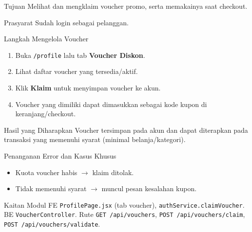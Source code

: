 
\begin{flowsection}{Tujuan}
Melihat dan mengklaim voucher promo, serta memakainya saat checkout.
\end{flowsection}

\begin{flowsection}{Prasyarat}
Sudah login sebagai pelanggan.
\end{flowsection}

\begin{flowsection}{Langkah Mengelola Voucher}
\begin{enumerate}
  \item Buka \texttt{/profile} lalu tab \textbf{Voucher Diskon}.
  \item Lihat daftar voucher yang tersedia/aktif.
  \item Klik \textbf{Klaim} untuk menyimpan voucher ke akun.
  \item Voucher yang dimiliki dapat dimasukkan sebagai kode kupon di keranjang/checkout.
\end{enumerate}
\end{flowsection}


\begin{flowsection}{Hasil yang Diharapkan}
Voucher tersimpan pada akun dan dapat diterapkan pada transaksi yang memenuhi
syarat (minimal belanja/kategori).
\end{flowsection}

\begin{flowsection}{Penanganan Error dan Kasus Khusus}
\begin{itemize}
  \item Kuota voucher habis $\rightarrow$ klaim ditolak.
  \item Tidak memenuhi syarat $\rightarrow$ muncul pesan kesalahan kupon.
\end{itemize}
\end{flowsection}

\begin{flowsection}{Kaitan Modul}
FE \texttt{ProfilePage.jsx} (tab voucher), \texttt{authService.claimVoucher}. BE
\texttt{VoucherController}. Rute \texttt{GET /api/vouchers}, \texttt{POST /api/vouchers/claim},
\texttt{POST /api/vouchers/validate}.
\end{flowsection}

